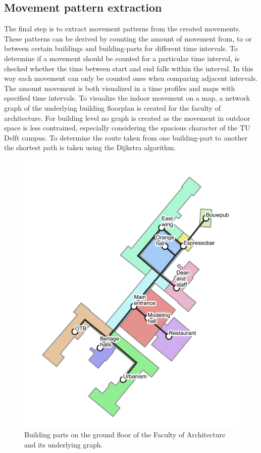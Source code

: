 \subsection{Movement pattern extraction}\label{ES-patternExtraction}
The final step is to extract movement patterns from the created movements. These patterns can be derived by counting the amount of movement from, to or between certain buildings and building-parts for different time intervals. To determine if a movement should be counted for a particular time interval, is checked whether the time between start and end falls within the interval. In this way each movement can only be counted ones when comparing adjacent intervals. The amount movement is both visualized in a time profiles and maps with specified time intervals. To visualize the indoor movement on a map, a network graph of the underlying building floorplan is created for the faculty of architecture. For building level no graph is created as the movement in outdoor space is less contrained, especially considering the spacious character of the TU Delft campus. To determine the route taken from one building-part to another the shortest path is taken using the Dijkstra algorithm.

\begin{figure}[H]
\centering
\includegraphics[scale=0.3]{bk_BG_bparts.png}
\captionsetup{justification=centering}
\caption{Building parts on the ground floor of the Faculty of Architecture and
its underlying graph.}
\label{figure:ES-bk_graph}
\end{figure}